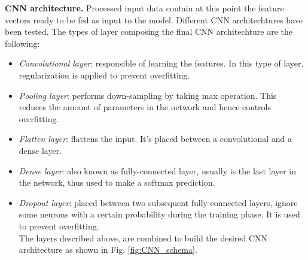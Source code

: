 \noindent\textbf{CNN architecture.} \label{subsec:arch} Processed input data contain at this point the feature vectors ready to be fed as input to the model. Different CNN architechtures have been tested. The types of layer composing the final CNN architechture are the following:
\begin{itemize}
\item {\it{Convolutional layer}}: responsible of learning the features. In this type of layer, regularization is applied to prevent overfitting.
\item {\it{Pooling layer}}: performs down-sampling by taking max operation. This reduces the amount of parameters in the network and hence controls overfitting.
\item {\it{Flatten layer}}: flattens the input. It's placed between a convolutional and a dense layer.
\item {\it{Dense layer}}: also known as fully-connected layer, usually is the last layer in the network, thus used to make a softmax prediction.
\item {\it{Dropout layer}}: placed between two subsequent fully-connected layers, ignore some neurons with a certain probability during the training phase. It is used to prevent overfitting.\\

\noindent The layers described above, are combined to build the desired CNN architecture as shown in Fig. \ref{fig:CNN_schema}.  

\end{itemize}
